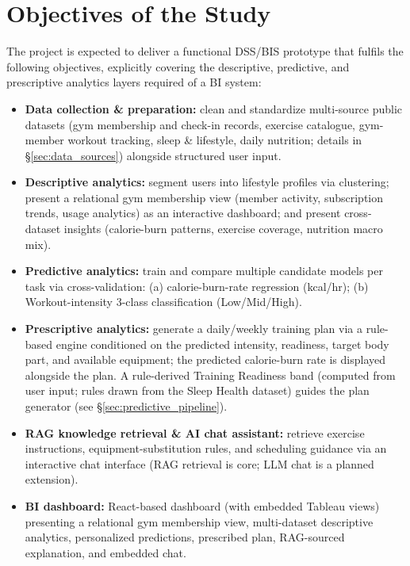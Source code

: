 \documentclass{aitthesis}
\begin{document}
\section{Objectives of the Study}

The project is expected to deliver a functional DSS/BIS prototype that fulfils the following objectives, explicitly covering the descriptive, predictive, and prescriptive analytics layers required of a BI system:
\begin{itemize}
    \item \textbf{Data collection \& preparation:} clean and standardize multi-source public datasets (gym membership and check-in records, exercise catalogue, gym-member workout tracking, sleep \& lifestyle, daily nutrition; details in \S\ref{sec:data_sources}) alongside structured user input.
    \item \textbf{Descriptive analytics:} segment users into lifestyle profiles via clustering; present a relational gym membership view (member activity, subscription trends, usage analytics) as an interactive dashboard; and present cross-dataset insights (calorie-burn patterns, exercise coverage, nutrition macro mix).
    \item \textbf{Predictive analytics:} train and compare multiple candidate models per task via cross-validation: (a) calorie-burn-rate regression (kcal/hr); (b) Workout-intensity 3-class classification (Low/Mid/High).
    \item \textbf{Prescriptive analytics:} generate a daily/weekly training plan via a rule-based engine conditioned on the predicted intensity, readiness, target body part, and available equipment; the predicted calorie-burn rate is displayed alongside the plan. A rule-derived Training Readiness band (computed from user input; rules drawn from the Sleep Health dataset) guides the plan generator (see \S\ref{sec:predictive_pipeline}).
    \item \textbf{RAG knowledge retrieval \& AI chat assistant:} retrieve exercise instructions, equipment-substitution rules, and scheduling guidance via an interactive chat interface (RAG retrieval is core; LLM chat is a planned extension).
    \item \textbf{BI dashboard:} React-based dashboard (with embedded Tableau views) presenting a relational gym membership view, multi-dataset descriptive analytics, personalized predictions, prescribed plan, RAG-sourced explanation, and embedded chat.
\end{itemize}
\end{document}
